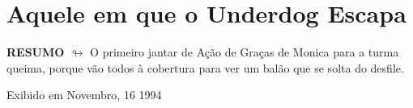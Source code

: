 \chapter{Aquele em que o Underdog Escapa}

\textbf{RESUMO $\looparrowright$} O primeiro jantar de Ação de Graças de Monica para a turma queima, porque vão todos à cobertura para ver um balão que se solta do desfile.

\begin{flushright}
\textcolor{gray600}{Exibido em Novembro, 16 1994}
\end{flushright}


